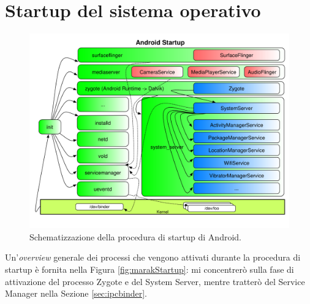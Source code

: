 \section{Startup del sistema operativo}
\begin{figure}[thp]
\centering
\includegraphics[scale=0.5]{img/marak/StartupWalkthru}
\caption{Schematizzazione della procedura di startup di Android. \parencite{site:marakAndroidInternals}}
\label{fig:marakStartup}
\end{figure}
Un'\textit{overview} generale dei processi che vengono attivati durante la procedura
di startup è fornita nella Figura \vref{fig:marakStartup}: mi
concentrerò sulla fase di attivazione del processo Zygote e del System Server, mentre
tratterò del Service Manager nella Sezione \vref{sec:ipcbinder}.

